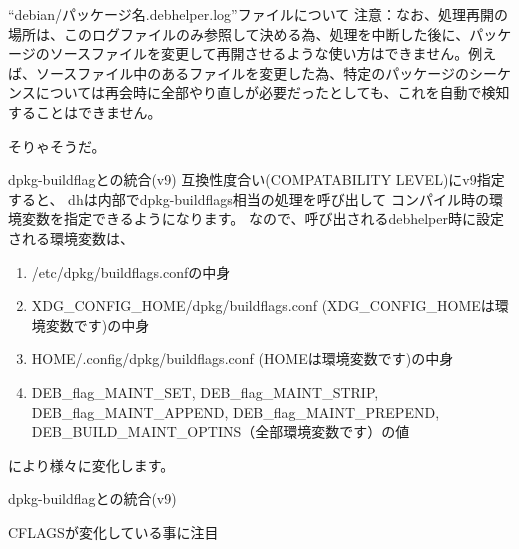 \begin{frame}{``debian/パッケージ名.debhelper.log''ファイルについて}
注意：なお、処理再開の場所は、このログファイルのみ参照して決める為、処理を中断した後に、パッケージのソースファイルを変更して再開させるような使い方はできません。例えば、ソースファイル中のあるファイルを変更した為、特定のパッケージのシーケンスについては再会時に全部やり直しが必要だったとしても、これを自動で検知することはできません。
\begin{center}
そりゃそうだ。
\end{center}
\end{frame}

\begin{frame}{dpkg-buildflagとの統合(v9)}
互換性度合い(COMPATABILITY LEVEL)にv9指定すると、
dhは内部でdpkg-buildflags相当の処理を呼び出して
コンパイル時の環境変数を指定できるようになります。
なので、呼び出されるdebhelper時に設定される環境変数は、
\begin{enumerate}
\item /etc/dpkg/buildflags.confの中身
\item XDG\_CONFIG\_HOME/dpkg/buildflags.conf (XDG\_CONFIG\_HOMEは環境変数です)の中身
\item HOME/.config/dpkg/buildflags.conf (HOMEは環境変数です)の中身
\item DEB\_flag\_MAINT\_SET, DEB\_flag\_MAINT\_STRIP, DEB\_flag\_MAINT\_APPEND, DEB\_flag\_MAINT\_PREPEND, DEB\_BUILD\_MAINT\_OPTINS（全部環境変数です）の値
\end{enumerate}
により様々に変化します。
\end{frame}
\begin{frame}[containsverbatim]{dpkg-buildflagとの統合(v9)}

\begin{center}
CFLAGSが変化している事に注目
\end{center}
\end{frame}
